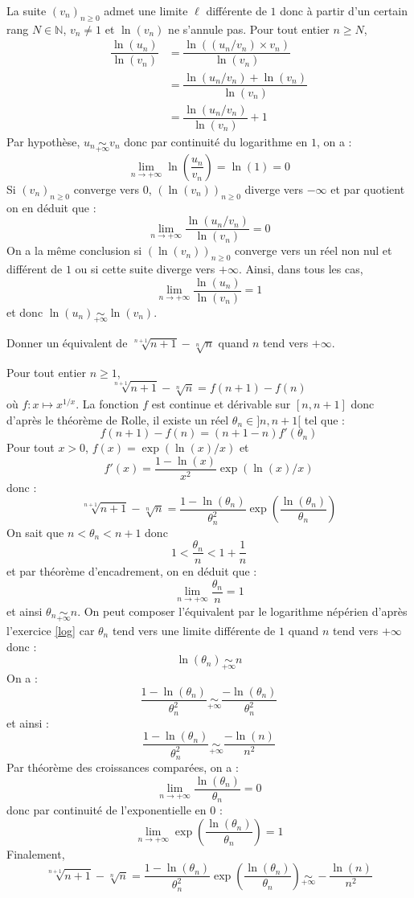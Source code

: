 \documentclass[a4paper,10pt]{report}
\begin{document}
\corr La suite $(v_n)_{n \geq 0}$ admet une limite $\ell$ différente de $1$ donc à partir d'un certain rang $N \in \mathbb{N}$, $v_n \neq 1$ et $\ln(v_n)$ ne s'annule pas. Pour tout entier $n \geq N$,
\begin{align*}
 \dfrac{\ln(u_n)}{\ln(v_n)} & = \dfrac{\ln((u_n/v_n)\times v_n)}{\ln(v_n)} \\
 & = \dfrac{\ln(u_n/v_n) + \ln(v_n)}{\ln(v_n)} \\
 & = \dfrac{\ln(u_n/v_n)}{\ln(v_n)} + 1 
 \end{align*}
Par hypothèse, $u_n \underset{+ \infty}{\sim} v_n$ donc par continuité du logarithme en $1$, on a :
$$ \lim_{n \rightarrow + \infty} \ln \left( \dfrac{u_n}{v_n} \right) = \ln(1)=0$$
Si $(v_n)_{n \geq 0}$ converge vers $0$, $(\ln(v_n))_{n \geq 0}$ diverge vers $- \infty$ et par quotient on en déduit que :
$$ \lim_{n \rightarrow + \infty} \dfrac{\ln(u_n/v_n)}{\ln(v_n)} = 0$$
On a la même conclusion si $(\ln(v_n))_{n \geq 0}$ converge vers un réel non nul et différent de $1$ ou si cette suite diverge vers $+ \infty$. Ainsi, dans tous les cas, 
$$ \lim_{n \rightarrow + \infty}  \dfrac{\ln(u_n)}{\ln(v_n)} = 1$$
et donc $\ln(u_n) \underset{+ \infty}{\sim} \ln(v_n)$.

\medskip



\begin{Exa}[\ding{80}] Donner un équivalent de $\sqrt[n+1]{n+1} - \sqrt[n]{n}$ quand $n$ tend vers $+ \infty$.
\end{Exa} 

\corr Pour tout entier $n \geq 1$,
$$ \sqrt[n+1]{n+1} - \sqrt[n]{n} = f(n+1)-f(n)$$
où $f : x \mapsto x^{1/x}$. La fonction $f$ est continue et dérivable sur $[n,n+1]$ donc d'après le théorème de Rolle, il existe un réel $\theta_n \in ]n,n+1[$ tel que :
$$ f(n+1)-f(n) = (n+1-n) f'(\theta_n)$$
Pour tout $x>0$, $f(x)=\exp (\ln(x)/x)$ et 
$$ f'(x) = \dfrac{1-\ln(x)}{x^2} \exp(\ln(x)/x)$$
donc :
$$ \sqrt[n+1]{n+1} - \sqrt[n]{n} = \dfrac{1-\ln(\theta_n)}{\theta_n^2} \exp \left( \dfrac{\ln(\theta_n)}{\theta_n} \right)$$
On sait que $n< \theta_n < n+1$ donc 
$$ 1 < \dfrac{\theta_n}{n} < 1+ \dfrac{1}{n}$$
et par théorème d'encadrement, on en déduit que :
$$ \lim_{n \rightarrow + \infty} \dfrac{\theta_n}{n} = 1$$
et ainsi $\theta_n \underset{+ \infty}{\sim} n$. On peut composer l'équivalent par le logarithme népérien d'après l'exercice \ref{log} car $\theta_n$ tend vers une limite différente de $1$ quand $n$ tend vers $+ \infty$ donc :
$$ \ln(\theta_n) \underset{+ \infty}{\sim} n$$
On a :
$$ \dfrac{1-\ln(\theta_n)}{\theta_n^2} \underset{+ \infty}{\sim}  \dfrac{-\ln(\theta_n)}{\theta_n^2}$$
et ainsi :
$$  \dfrac{1-\ln(\theta_n)}{\theta_n^2} \underset{+ \infty}{\sim}  \dfrac{-\ln(n)}{n^2}$$
Par théorème des croissances comparées, on a :
$$ \lim_{n \rightarrow + \infty} \dfrac{\ln(\theta_n)}{\theta_n} = 0$$
donc par continuité de l'exponentielle en $0$ :
$$  \lim_{n \rightarrow + \infty} \exp \left( \dfrac{\ln(\theta_n)}{\theta_n} \right) =1$$
Finalement,
$$  \sqrt[n+1]{n+1} - \sqrt[n]{n} = \dfrac{1-\ln(\theta_n)}{\theta_n^2} \exp \left( \dfrac{\ln(\theta_n)}{\theta_n} \right) \underset{+ \infty}{\sim} - \dfrac{\ln(n)}{n^2}$$
\end{document}
